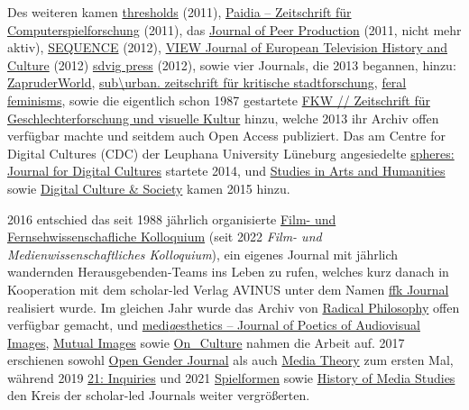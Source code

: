 \documentclass[a4paper,
fontsize=11pt,
oneside,
numbers=noperiodatend,
parskip=half-,
bibliography=totoc,
final
]{scrartcl}
\begin{document}
Des weiteren kamen \href{http://openthresholds.org/}{thresholds} (2011),
\href{https://www.paidia.de/}{Paidia -- Zeitschrift für
Computerspielforschung} (2011), das
\href{https://web.archive.org/web/20120510164302/http://peerproduction.net/issues/issue-0/}{Journal
of Peer Production} (2011, nicht mehr aktiv),
\href{https://reframe.sussex.ac.uk/sequence1/}{SEQUENCE} (2012),
\href{https://viewjournal.eu/about/}{VIEW Journal of European Television
History and Culture} (2012) \href{https://www.sdvigpress.org}{sdvig
press} (2012), sowie vier Journals, die 2013 begannen, hinzu:
\href{https://zapruderworld.org/journal/past-volumes/}{ZapruderWorld},
\href{https://zeitschrift-suburban.de/sys/index.php/suburban/}{sub\textbackslash urban.
zeitschrift für kritische stadtforschung},
\href{https://feralfeminisms.com}{feral feminisms}, sowie die eigentlich
schon 1987 gestartete
\href{https://www.fkw-journal.de/index.php/fkw/about}{FKW // Zeitschrift
für Geschlechterforschung und visuelle Kultur} hinzu, welche 2013 ihr
Archiv offen verfügbar machte und seitdem auch Open Access publiziert.
Das am Centre for Digital Cultures (CDC) der Leuphana University
Lüneburg angesiedelte \href{https://spheres-journal.org/about/}{spheres:
Journal for Digital Cultures} startete 2014, und
\href{https://www.sahjournal.com/site/about/}{Studies in Arts and
Humanities} sowie \href{http://digicults.org/}{Digital Culture \&
Society} kamen 2015 hinzu.

2016 entschied das seit 1988 jährlich organisierte
\href{http://kolloquium.ffk-journal.de/fundstuecke/}{Film- und
Fernsehwissenschafliche Kolloquium} (seit 2022 \emph{Film- und
Medienwissenschaftliches Kolloquium}), ein eigenes Journal mit jährlich
wandernden Herausgebenden-Teams ins Leben zu rufen, welches kurz danach
in Kooperation mit dem scholar-led Verlag AVINUS unter dem Namen
\href{http://www.ffk-journal.de/}{ffk Journal} realisiert wurde. Im
gleichen Jahr wurde das Archiv von
\href{https://www.radicalphilosophyarchive.com/this-archive/}{Radical
Philosophy} offen verfügbar gemacht, und
\href{https://www.mediaesthetics.org/index.php/mae/issue/view/5}{medi\emph{a}esthetics
-- Journal of Poetics of Audiovisual Images},
\href{https://www.mutualimages-journal.org/}{Mutual Images} sowie
\href{https://www.on-culture.org/journal/}{On\_Culture} nahmen die
Arbeit auf. 2017 erschienen sowohl
\href{https://opengenderjournal.de/}{Open Gender Journal} als auch
\href{https://journalcontent.mediatheoryjournal.org/index.php/mt/issue/view/1}{Media
Theory} zum ersten Mal, während 2019
\href{https://21-inquiries.eu/en/about-the-journal/}{21: Inquiries} und
2021
\href{https://www.gamescoop.uni-siegen.de/spielformen/index.php/journal}{Spielformen}
sowie \href{https://hms.mediastudies.press/}{History of Media Studies}
den Kreis der scholar-led Journals weiter vergrößerten.
\end{document}
